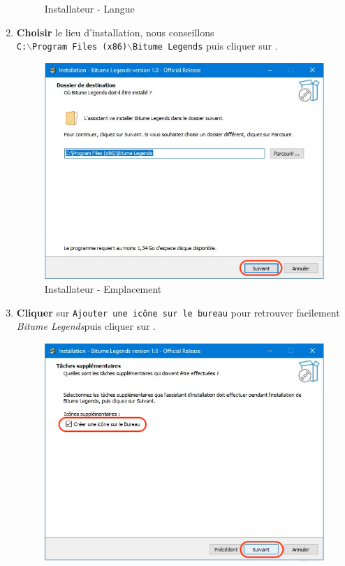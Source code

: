 \documentclass[a4paper,12pt]{article}
\newcommand{\btmlgs}{\textsl{Bitume Legends}}
\begin{document}
\begin{enumerate}
\begin{figure}[h]
                    \caption{Installateur - Langue}
                \end{figure}
            \item 
                \textbf{Choisir} le lieu d'installation, nous conseillons
                \\\texttt{C:$\backslash${Program} Files (x86)$\backslash${Bitume Legends}}
                puis cliquer sur .
                \begin{figure}[h]
                    \centering
                    \includegraphics[scale=0.5]{install_location.png}
                    \caption{Installateur - Emplacement}
                \end{figure}
            \clearpage
            \item 
                \textbf{Cliquer} sur \texttt{Ajouter une icône sur le bureau}
                pour retrouver facilement \btmlgs puis cliquer sur .
                \begin{figure}[h]
                    \centering
                    \includegraphics[scale=0.4]{shortcut.png}

\end{figure}
\end{enumerate}
\end{document}
